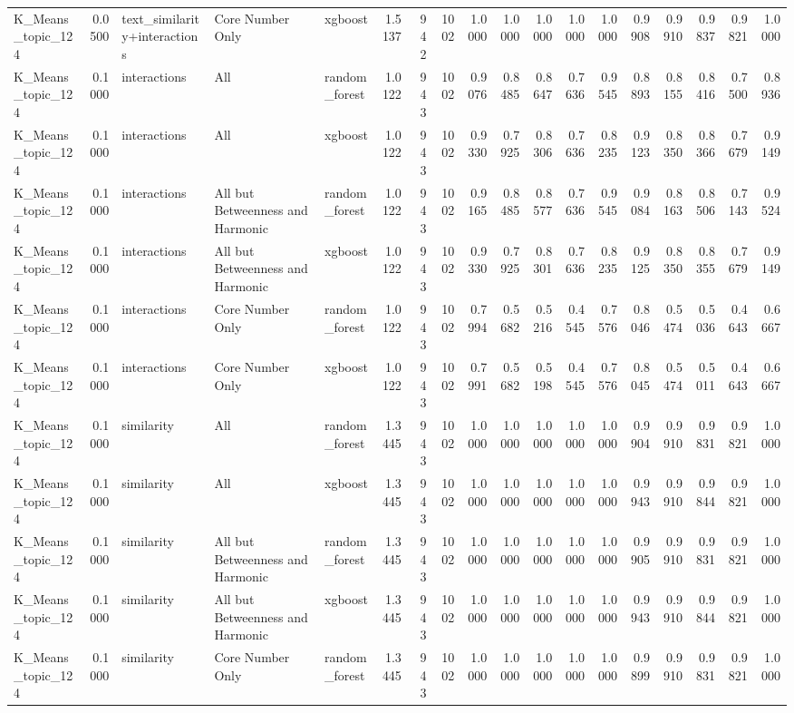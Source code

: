 \begin{tabular}{lrlllrrrrrrrrrrrrr}
K_Means_topic_124 & 0.0500 & text_similarity+interactions & Core Number Only & xgboost & 1.5137 & 942 & 1002 & 1.0000 & 1.0000 & 1.0000 & 1.0000 & 1.0000 & 0.9908 & 0.9910 & 0.9837 & 0.9821 & 1.0000 \\
K_Means_topic_124 & 0.1000 & interactions & All & random_forest & 1.0122 & 943 & 1002 & 0.9076 & 0.8485 & 0.8647 & 0.7636 & 0.9545 & 0.8893 & 0.8155 & 0.8416 & 0.7500 & 0.8936 \\
K_Means_topic_124 & 0.1000 & interactions & All & xgboost & 1.0122 & 943 & 1002 & 0.9330 & 0.7925 & 0.8306 & 0.7636 & 0.8235 & 0.9123 & 0.8350 & 0.8366 & 0.7679 & 0.9149 \\
K_Means_topic_124 & 0.1000 & interactions & All but Betweenness and Harmonic & random_forest & 1.0122 & 943 & 1002 & 0.9165 & 0.8485 & 0.8577 & 0.7636 & 0.9545 & 0.9084 & 0.8163 & 0.8506 & 0.7143 & 0.9524 \\
K_Means_topic_124 & 0.1000 & interactions & All but Betweenness and Harmonic & xgboost & 1.0122 & 943 & 1002 & 0.9330 & 0.7925 & 0.8301 & 0.7636 & 0.8235 & 0.9125 & 0.8350 & 0.8355 & 0.7679 & 0.9149 \\
K_Means_topic_124 & 0.1000 & interactions & Core Number Only & random_forest & 1.0122 & 943 & 1002 & 0.7994 & 0.5682 & 0.5216 & 0.4545 & 0.7576 & 0.8046 & 0.5474 & 0.5036 & 0.4643 & 0.6667 \\
K_Means_topic_124 & 0.1000 & interactions & Core Number Only & xgboost & 1.0122 & 943 & 1002 & 0.7991 & 0.5682 & 0.5198 & 0.4545 & 0.7576 & 0.8045 & 0.5474 & 0.5011 & 0.4643 & 0.6667 \\
K_Means_topic_124 & 0.1000 & similarity & All & random_forest & 1.3445 & 943 & 1002 & 1.0000 & 1.0000 & 1.0000 & 1.0000 & 1.0000 & 0.9904 & 0.9910 & 0.9831 & 0.9821 & 1.0000 \\
K_Means_topic_124 & 0.1000 & similarity & All & xgboost & 1.3445 & 943 & 1002 & 1.0000 & 1.0000 & 1.0000 & 1.0000 & 1.0000 & 0.9943 & 0.9910 & 0.9844 & 0.9821 & 1.0000 \\
K_Means_topic_124 & 0.1000 & similarity & All but Betweenness and Harmonic & random_forest & 1.3445 & 943 & 1002 & 1.0000 & 1.0000 & 1.0000 & 1.0000 & 1.0000 & 0.9905 & 0.9910 & 0.9831 & 0.9821 & 1.0000 \\
K_Means_topic_124 & 0.1000 & similarity & All but Betweenness and Harmonic & xgboost & 1.3445 & 943 & 1002 & 1.0000 & 1.0000 & 1.0000 & 1.0000 & 1.0000 & 0.9943 & 0.9910 & 0.9844 & 0.9821 & 1.0000 \\
K_Means_topic_124 & 0.1000 & similarity & Core Number Only & random_forest & 1.3445 & 943 & 1002 & 1.0000 & 1.0000 & 1.0000 & 1.0000 & 1.0000 & 0.9899 & 0.9910 & 0.9831 & 0.9821 & 1.0000 \\

\end{tabular}
